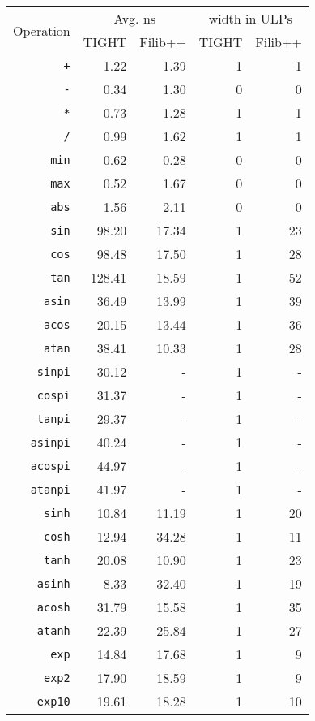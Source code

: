 \begin{table}
\centering
\label{table:benchmarks}
\caption{}
\begin{tabular}{r|rr|rr}
\multirow{2}{*}{Operation} & \multicolumn{2}{c|}{Avg. ns} & \multicolumn{2}{c}{width in ULPs} \\
& TIGHT & Filib++ & TIGHT & Filib++ \\
\hline
\texttt{+} & 1.22 & 1.39 & 1 & 1 \\
\texttt{-} & 0.34 & 1.30 & 0 & 0 \\
\texttt{*} & 0.73 & 1.28 & 1 & 1 \\
\texttt{/} & 0.99 & 1.62 & 1 & 1 \\
\texttt{min} & 0.62 & 0.28 & 0 & 0 \\
\texttt{max} & 0.52 & 1.67 & 0 & 0 \\
\texttt{abs} & 1.56 & 2.11 & 0 & 0 \\
\texttt{sin} & 98.20 & 17.34 & 1 & 23 \\
\texttt{cos} & 98.48 & 17.50 & 1 & 28 \\
\texttt{tan} & 128.41 & 18.59 & 1 & 52 \\
\texttt{asin} & 36.49 & 13.99 & 1 & 39 \\
\texttt{acos} & 20.15 & 13.44 & 1 & 36 \\
\texttt{atan} & 38.41 & 10.33 & 1 & 28 \\
\texttt{sinpi} & 30.12 & - & 1 & - \\
\texttt{cospi} & 31.37 & - & 1 & - \\
\texttt{tanpi} & 29.37 & - & 1 & - \\
\texttt{asinpi} & 40.24 & - & 1 & - \\
\texttt{acospi} & 44.97 & - & 1 & - \\
\texttt{atanpi} & 41.97 & - & 1 & - \\
\texttt{sinh} & 10.84 & 11.19 & 1 & 20 \\
\texttt{cosh} & 12.94 & 34.28 & 1 & 11 \\
\texttt{tanh} & 20.08 & 10.90 & 1 & 23 \\
\texttt{asinh} & 8.33 & 32.40 & 1 & 19 \\
\texttt{acosh} & 31.79 & 15.58 & 1 & 35 \\
\texttt{atanh} & 22.39 & 25.84 & 1 & 27 \\
\texttt{exp} & 14.84 & 17.68 & 1 & 9 \\
\texttt{exp2} & 17.90 & 18.59 & 1 & 9 \\
\texttt{exp10} & 19.61 & 18.28 & 1 & 10 \\

\end{tabular}
\end{table}
